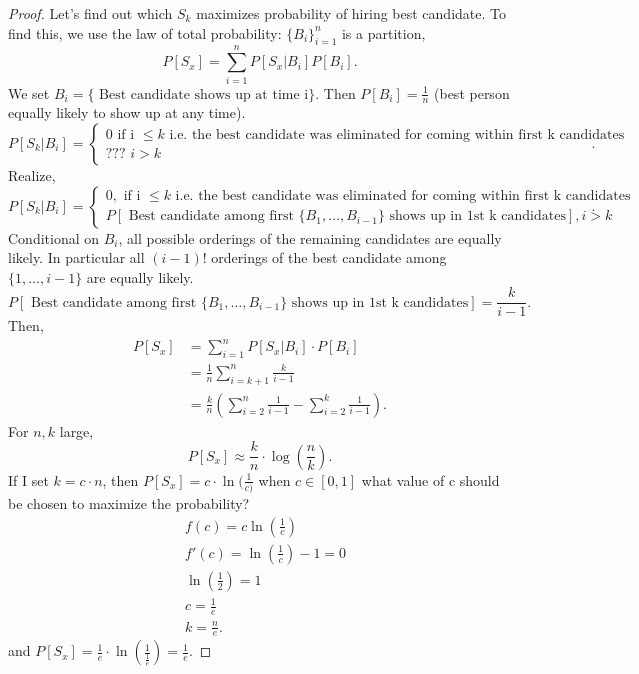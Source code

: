 \documentclass[a4paper]{article}
\begin{document}
 \begin{proof}
   Let's find out which $S_k$ maximizes probability of hiring best candidate. To find this, we use the law of 
   total probability:  $\{B_i\}_{i=1}^{n}$ is a partition, 
   \[
     P[S_x] = \sum_{i=1}^{n} P[S_x | B_i] P[B_i]
   .\] 
   We set $B_i = \{ \text{ Best candidate shows up at time i}\}$. Then $P[B_i] = \frac{1}{n}$ (best person
   equally likely to show up at any time).  
   \[
     P[S_k | B_i] = \begin{cases}
       0 \text{ if i $\leq k$ i.e. the best candidate was eliminated for coming within first k candidates} \\
       \text{???  } i > k 
     \end{cases}
   .\] 
   Realize,
   \[
     P[S_k | B_i] = \begin{cases}
       0, \text{ if i $\leq k$ i.e. the best candidate was eliminated for coming within first k candidates} \\
       P[\text{ Best candidate among first $\{B_1,\ldots,B_{i-1}\}$ shows up in 1st k candidates}], i > k 
     \end{cases}
   .\]
   Conditional on $B_i$, all possible orderings of the remaining candidates are equally likely. In particular
   all  $(i-1)!$ orderings of the best candidate among  $\{1,\ldots,i-1\}$ are equally likely.
    \[
    P[\text{ Best candidate among first $\{B_1,\ldots,B_{i-1}\}$ shows up in 1st k candidates}] = \frac{k}{i-1}
   .\]
   Then,
   \begin{align*}
     P[S_x] &= \sum_{i=1}^{n} P[S_x | B_i] \cdot P[B_i] \\
            &= \frac{1}{n} \sum_{i=k+1}^{n} \frac{k}{i-1} \\
            &= \frac{k}{n} \left( \sum_{i=2}^n \frac{1}{i-1} 
            - \sum_{i=2}^{k} \frac{1}{i-1} \right) 
   .\end{align*}
   For $n,k$ large, 
    \[
      P[S_x] \approx \frac{k}{n} \cdot \log\left( \frac{n}{k} \right) 
   .\]
   If I set $k = c \cdot n$, then  $P[S_x] = c \cdot \ln(\frac{1}{c)}$ when $c \in [0,1]$ what value of
   c should be chosen to maximize the probability?
    \begin{align*}
      & f(c) = c \ln(\frac{1}{c}) \\
      & f'(c) = \ln(\frac{1}{c}) - 1 = 0 \\
      & \ln(\frac{1}{2}) = 1 \\
      & c = \frac{1}{e} \\
      & k = \frac{n}{e} 
   .\end{align*}
   and $P[S_x] = \frac{1}{e} \cdot \ln(\frac{1}{\frac{1}{e}}) =\frac{1}{e}$.
 \end{proof}
\end{document}
